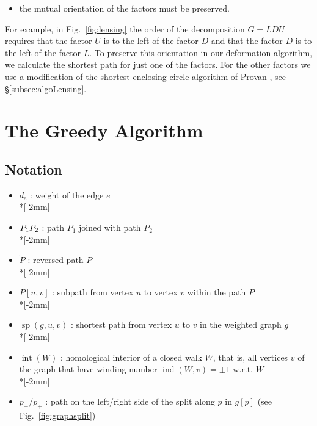\documentclass[reqno]{amsart}
\let\join\relax
\DeclareMathOperator{\join}{\dot{+}}
\DeclareMathOperator{\ind}{ind}
\DeclareMathOperator{\spa}{sp}
\DeclareMathOperator{\interior}{int}
\begin{document}
\begin{itemize}
	\item[(iv)] the mutual orientation of the factors must be preserved.
\end{itemize}

For example, in Fig.~\ref{fig:lensing} the order of the decomposition $G = LDU$ requires that the factor $U$ is to the left of 
the factor $D$ and that the factor $D$ is to the left of the factor $L$. To preserve this orientation in our deformation algorithm, we calculate the shortest path for just one of the factors. For the other factors we use a 
modification of the shortest enclosing circle algorithm of Provan \cite{provan89}, see §\ref{subsec:algoLensing}.

\section{The Greedy Algorithm}\label{sec:algorithm}

\subsection{Notation}
\begin{itemize}
	\item $d_e$ : weight of the edge $e$\\*[-2mm]
	\item $P_1 \join P_2$ : path $P_1$ joined with path $P_2$\\*[-2mm]
	\item $\overleftarrow{P}$ : reversed path $P$\\*[-2mm]
	\item $P[u,v]$ : subpath from vertex $u$ to vertex $v$ within the path $P$\\*[-2mm]
	\item $\spa(g,u,v)$ : shortest path from vertex $u$ to $v$ in the weighted graph $g$\\*[-2mm]
	\item $\interior(W)$ : homological interior of a closed walk $W$, that is, all vertices $v$ of the graph that have winding number $\ind(W,v) = \pm 1$ w.r.t. $W$\\*[-2mm]
	\item $p_- / p_+$ : path on the left/right side of the split along $p$ in $g[p]$ (see Fig.~\ref{fig:graphsplit})
\end{itemize}
\end{document}
